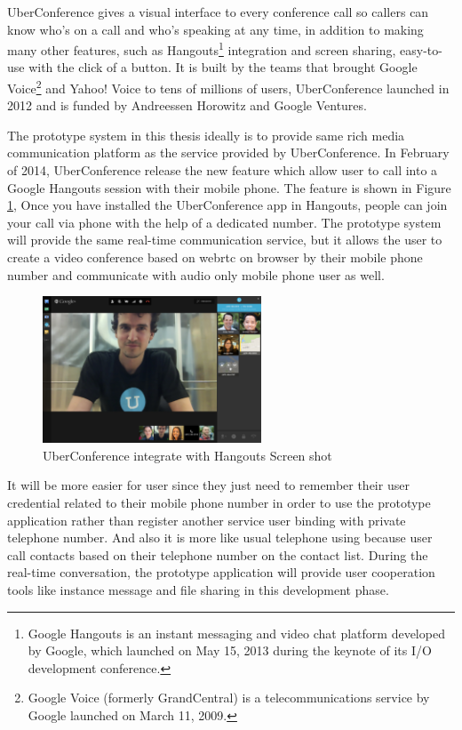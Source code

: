 \par UberConference gives a visual interface to every conference call so callers can know who's on a call and who's speaking at any time, in addition to making many other features, such as Hangouts\footnote{Google Hangouts is an instant messaging and video chat platform developed by Google, which launched on May 15, 2013 during the keynote of its I/O development conference.\cite{wiki:hangouts}} integration and screen sharing, easy-to-use with the click of a button. It is built by the teams that brought Google Voice\footnote{Google Voice (formerly GrandCentral) is a telecommunications service by Google launched on March 11, 2009.\cite{wiki:googleVoice}} and Yahoo! Voice to tens of millions of users, UberConference launched in 2012 and is funded by Andreessen Horowitz and Google Ventures.\cite{web:uberconference}

\par The prototype system in this thesis ideally is to provide same rich media communication platform as the service provided by UberConference. In February of 2014, UberConference release the new feature which allow user to call into a Google Hangouts session with their mobile phone. The feature is shown in Figure \ref{fig:uberconference}, Once you have installed the UberConference app in Hangouts, people can join your call via phone with the help of a dedicated number. The prototype system will provide the same real-time communication service, but it allows the user to create a video conference based on \gls{webrtc} on browser by their mobile phone number and communicate with audio only mobile phone user as well. 
\begin{figure}
	\centering
    	\includegraphics[width=0.58\textwidth,natwidth=610,natheight=642]{figs/uberconference_hangout.jpg}
  	\caption{UberConference integrate with Hangouts Screen shot\cite{tnw:uberconference}}
  	\label{fig:uberconference}
\end{figure}
It will be more easier for user since they just need to remember their user credential related to their mobile phone number in order to use the prototype application rather than register another service user binding with private telephone number. And also it is more like usual telephone using because user call contacts based on their telephone number on the contact list. During the real-time conversation, the prototype application will provide user cooperation tools like instance message and file sharing in this development phase.

